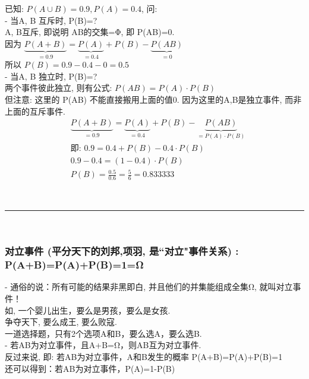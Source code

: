 \documentclass[UTF8]{ctexart}
\begin{document}
	
	\begin{myEnvSample}
		已知: $P(A \cup B)=0.9, P(A)=0.4$, 问: \\
		
		- 当A, B 互斥时, P(B)=? \\
		A, B互斥, 即说明 AB的交集=Φ,  即 P(AB)=0. \\
		因为 $\underset{=0.9}{\underbrace{P(A+B)}}=\underset{=0.4}{\underbrace{P(A)}}+P(B)-\underset{=0}{\underbrace{P(AB)}}$ \\
		所以 $P(B)=0.9-0.4-0=0.5$ \\
		
		
		
		- 当A, B 独立时, P(B)=? \\
		两个事件彼此独立, 则有公式: $P(AB) = P(A) \cdot P(B)$ \\
		但注意: 这里的 P(AB) 不能直接搬用上面的值0. 因为这里的A,B是独立事件, 而非上面的互斥事件.  
		\begin{align*}  %
			&\underset{=0.9}{\underbrace{P(A+B)}}=\underset{=0.4}{\underbrace{P(A)}}+P(B)-\underset{=P(A)\cdot P(B)}{\underbrace{P(AB)}}\\
			&\text{即:\ }0.9=0.4+P(B)-0.4\cdot P(B)\\
			&0.9-0.4=(1-0.4)\cdot P(B)\\
			&P(B)=\frac{0.5}{0.6}=\frac{5}{6}=0.833333
		\end{align*}
		
		
	\end{myEnvSample}
	
	
	~\\
	\hrule
	~\\
	
	
	\subsubsection{对立事件 (平分天下的刘邦,项羽, 是``对立"事件关系) : P(A+B)=P(A)+P(B)=1=Ω }
	
	- 通俗的说：所有可能的结果非黑即白, 并且他们的并集能组成全集Ω, 就叫对立事件！ \\
	如, 一个婴儿出生，要么是男孩，要么是女孩. \\
	争夺天下, 要么成王, 要么败寇. \\
	一道选择题，只有2个选项A和B，要么选A，要么选B. \\
	
	
	- 若AB为对立事件，且A+B=Ω，则AB互为对立事件.  \\
	反过来说, 即: 若AB为对立事件，A和B发生的概率 P(A+B)=P(A)+P(B)=1 \\
	还可以得到：若AB为对立事件，P(A)=1-P(B) \\
	
\end{document}
